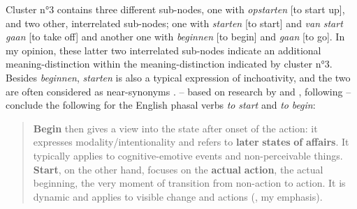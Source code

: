 Cluster n°3 contains three different sub-nodes, one with \textit{opstarten} [to start up], and two other, interrelated sub-nodes; one with \textit{starten} [to start] and \textit{van} \textit{start} \textit{gaan} [to take off] and another one with \textit{beginnen} [to begin] and \textit{gaan} [to go]. In my opinion, these latter two interrelated sub-nodes indicate an additional meaning-distinction within the meaning-distinction indicated by cluster n°3. Besides \textit{beginnen}, \textit{starten} is also a typical expression of inchoativity, and the two are often considered as near-synonyms \citep[223]{schmid_introspection_1996}. \citet{lewandowska-tomasczyk_corpus-based_2009} – based on research by \citet{biber_longman_1999} and \citet{schmid_cottage_1993}, following \citet{quirk_comprehensive_1985} – conclude the following for the English phasal verbs \textit{to} \textit{start} and \textit{to} \textit{begin}:

\begin{quote}
\textbf{Begin} then gives a view into the state after onset of the action: it expresses modality/intentionality and refers to \textbf{later} \textbf{states} \textbf{of} \textbf{affairs}. It typically applies to cognitive-emotive events and non-perceivable things. \textbf{Start}, on the other hand, focuses on the \textbf{actual} \textbf{action}, the actual beginning, the very moment of transition from non-action to action. It is dynamic and applies to visible change and actions (\citealt[279]{lewandowska-tomasczyk_corpus-based_2009}, my emphasis).
\end{quote}

